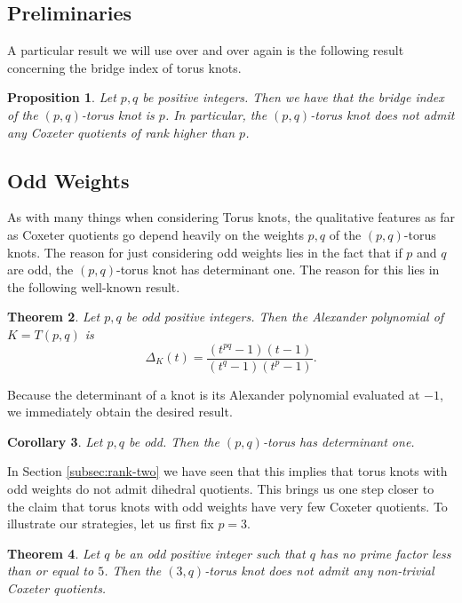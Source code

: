 \documentclass{article}
\newtheorem{theorem}{Theorem}[section]
\newtheorem{corollary}[theorem]{Corollary}
\newtheorem{proposition}[theorem]{Proposition}
\theoremstyle{definition}
\begin{document}
\subsection{Preliminaries}
A particular result we will use over and over again is the following result concerning the bridge index of torus knots.

\begin{proposition}
Let $p, q$ be positive integers. Then we have that the bridge index of the $(p, q)$-torus knot is $p$. In particular, the $(p, q)$-torus knot does not admit any Coxeter quotients of rank higher than $p$.
\end{proposition}

\subsection{Odd Weights}\label{subsec:odd-weights}
As with many things when considering Torus knots, the qualitative features as far as Coxeter quotients go depend heavily on the weights $p, q$ of the $(p, q)$-torus knots. The reason for just considering odd weights lies in the fact that if $p$ and $q$ are odd, the $(p, q)$-torus knot has determinant one. The reason for this lies in the following well-known result.

\begin{theorem}
Let $p, q$ be odd positive integers. Then the Alexander polynomial of $K = T(p, q)$ is
$$\Delta_K(t) = \frac{(t^{pq}-1)(t-1)}{(t^q-1)(t^p-1)}.$$
\end{theorem}

Because the determinant of a knot is its Alexander polynomial evaluated at $-1$, we immediately obtain the desired result.

\begin{corollary}
Let $p, q$ be odd. Then the $(p, q)$-torus has determinant one.
\end{corollary}

In Section \ref{subsec:rank-two} we have seen that this implies that torus knots with odd weights do not admit dihedral quotients. This brings us one step closer to the claim that torus knots with odd weights have very few Coxeter quotients. To illustrate our strategies, let us first fix $p = 3$.

\begin{theorem}\label{thm:p=3}
Let $q$ be an odd positive integer such that $q$ has no prime factor less than or equal to $5$. Then the $(3, q)$-torus knot does not admit any non-trivial Coxeter quotients.
\end{theorem}
\end{document}
